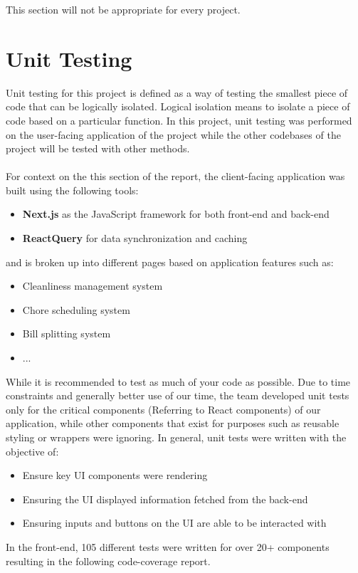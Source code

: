 \documentclass[12pt, titlepage]{article}
\begin{document}
This section will not be appropriate for every project.

\section{Unit Testing}
Unit testing for this project is defined as a way of testing the smallest piece of code that can be logically isolated. Logical isolation means to isolate a piece of code based on a particular function. In this project, unit testing was performed on the user-facing application of the project while the other codebases of the project will be tested with other methods.\\\\For context on the this section of the report, the client-facing application was built using the following tools:
\begin{itemize}
\item \textbf{Next.js} as the JavaScript framework for both front-end and back-end
\item \textbf{ReactQuery} for data synchronization and caching
\end{itemize}
and is broken up into different pages based on application features such as:
\begin{itemize}
\item Cleanliness management system
\item Chore scheduling system
\item Bill splitting system
\item ...
\end{itemize}
While it is recommended to test as much of your code as possible. Due to time constraints and generally better use of our time, the team developed unit tests only for the critical components (Referring to React components) of our application, while other components that exist for purposes such as reusable styling or wrappers were ignoring. In general, unit tests were written with the objective of:
\begin{itemize}
\item Ensure key UI components were rendering
\item Ensuring the UI displayed information fetched from the back-end
\item Ensuring inputs and buttons on the UI are able to be interacted with
\end{itemize}
In the front-end, 105 different tests were written for over 20+ components resulting in the following code-coverage report.
\end{document}
